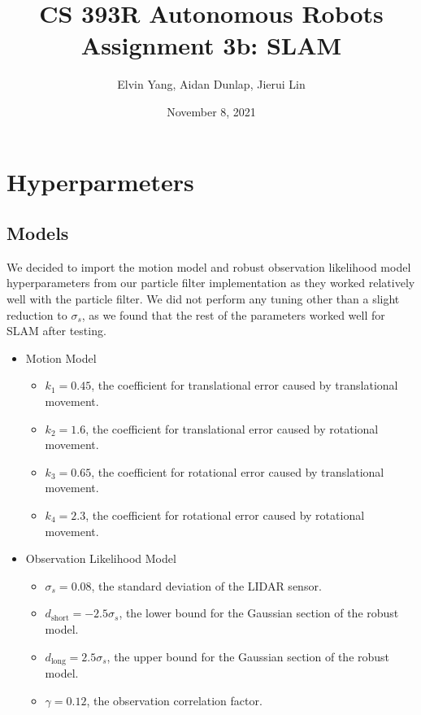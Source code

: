 \documentclass[11pt]{article}
\title{CS 393R Autonomous Robots \\ \large Assignment 3b: SLAM}
\author{Elvin Yang, Aidan Dunlap, Jierui Lin}
\date{November 8, 2021}
\begin{document}
\maketitle

\section{Hyperparmeters}

\subsection{Models}

We decided to import the motion model and robust observation likelihood model
hyperparameters from our particle filter implementation as they worked
relatively well with the particle filter. We did not perform any tuning other
than a slight reduction to $\sigma_s$, as we found that the rest of the
parameters worked well for SLAM after testing.

\def\dshort{d_{\textrm{short}}}
\def\dlong{d_{\textrm{long}}}

\begin{itemize}
    \setlength\itemsep{0pt}
    \item Motion Model
    \begin{itemize}
        \setlength\itemsep{0pt}
        \item $k_1 = 0.45$, the coefficient for translational error caused by translational movement.
        \item $k_2 = 1.6$, the coefficient for translational error caused by rotational movement.
        \item $k_3 = 0.65$, the coefficient for rotational error caused by translational movement.
        \item $k_4 = 2.3$, the coefficient for rotational error caused by rotational movement.
    \end{itemize}

    \item Observation Likelihood Model
    \begin{itemize}
        \setlength\itemsep{0pt}
        \item $\sigma_s = 0.08$, the standard deviation of the LIDAR sensor.
        \item $\dshort = -2.5 \sigma_s$, the lower bound for the Gaussian section of the robust model.
        \item $\dlong = 2.5 \sigma_s$, the upper bound for the Gaussian section of the robust model.
        \item $\gamma = 0.12$, the observation correlation factor.
    \end{itemize}
\end{itemize}
\end{document}

